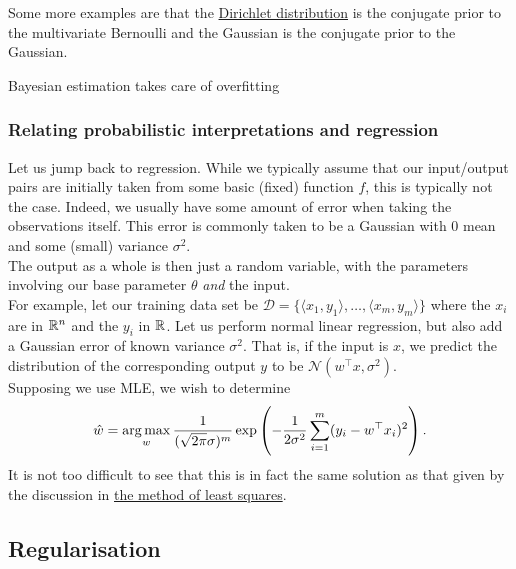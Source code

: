 \documentclass{article}
\begin{document}
			Some more examples are that the \href{https://en.wikipedia.org/wiki/Dirichlet_distribution}{Dirichlet distribution} is the conjugate prior to the multivariate Bernoulli and the Gaussian is the conjugate prior to the Gaussian.



			Bayesian estimation takes care of overfitting

		\subsubsection{Relating probabilistic interpretations and regression}

			Let us jump back to regression. While we typically assume that our input/output pairs are initially taken from some basic (fixed) function $f$, this is typically not the case. Indeed, we usually have some amount of error when taking the observations itself. This error is commonly taken to be a Gaussian with $0$ mean and some (small) variance $\sigma^2$.\\
			The output as a whole is then just a random variable, with the parameters involving our base parameter $\theta$ \emph{and} the input.\\
			
			For example, let our training data set be $\mathcal{D} = \{\langle x_1,y_1\rangle,\ldots,\langle x_m,y_m\rangle\}$ where the $x_i$ are in $\mathbb{R}^n$ and the $y_i$ in $\mathbb{R}$. Let us perform normal linear regression, but also add a Gaussian error of known variance $\sigma^2$. That is, if the input is $x$, we predict the distribution of the corresponding output $y$ to be $\mathcal{N}(w^\top x, \sigma^2)$.\\
			Supposing we use MLE, we wish to determine
			\[ \hat{w} = \operatorname*{arg\,max}_{w} \frac{1}{(\sqrt{2\pi}\sigma)^m} \exp \left( -\frac{1}{2\sigma^2} \sum_{i=1}^m (y_i - w^\top x_i)^2 \right). \]
			It is not too difficult to see that this is in fact the same solution as that given by the discussion in \hyperref[subsubsec: the method of least squares]{the method of least squares}.

	\subsection{Regularisation}
\end{document}
